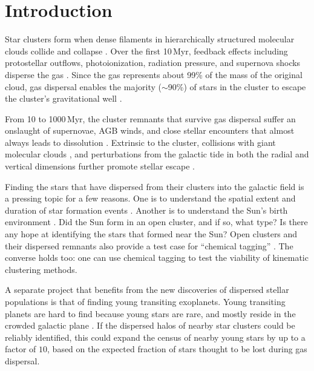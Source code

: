 \documentclass[12pt,twocolumn,tighten]{aastex63}
\begin{document}
\section{Introduction}

Star clusters form when dense filaments in hierarchically structured
molecular clouds collide and collapse \citep{shu_star_1987}.  Over the
first 10\,Myr, feedback effects including protostellar outflows,
photoionization, radiation pressure, and supernova shocks disperse the
gas \citep{krumholz_star_2019}.  Since the gas represents about 99\%
of the mass of the original cloud, gas dispersal enables the majority
($\sim$90\%) of stars in the cluster to escape the cluster's
gravitational well \citep{lada_embedded_2003}.

From 10 to 1000\,Myr, the cluster remnants that survive gas dispersal
suffer an onslaught of supernovae, AGB winds, and close stellar
encounters that almost always leads to dissolution
\citep{lamers_mass_loss_2010}.  Extrinsic to the cluster, collisions
with giant molecular clouds \citep{spitzer_disruption_1958}, and
perturbations from the galactic tide in both the radial and vertical
dimensions further promote stellar escape \citep[{\it
e.g.},][]{fukushige_timescale_2000,bergond_gravitational_2001}.

Finding the stars that have dispersed from their clusters into the
galactic field is a pressing topic for a few reasons.  One is to
understand the spatial extent and duration of star formation events
\citep[{\it e.g.},][]{wright_kinematics_2018}.  Another is to
understand the Sun's birth environment \citep{adams_birth_2010}.  Did
the Sun form in an open cluster, and if so, what type? Is there any
hope at identifying the stars that formed near the Sun?  Open clusters
and their dispersed remnants also provide a test case for ``chemical
tagging'' \citep[{\it
e.g.},][]{freeman_new_2002,hogg_chemical_2016,ness_dopplergangers_2018}.
The converse holds too: one can use chemical tagging to test the
viability of kinematic clustering methods.

A separate project that benefits from the new discoveries of dispersed
stellar populations is that of finding young transiting exoplanets.
Young transiting planets are hard to find because young stars are
rare, and mostly reside in the crowded galactic plane \citep[see {\it
e.g.},][]{Kharchenko_et_al_2013,piskunov_global_2018}.  If the
dispersed halos of nearby star clusters could be reliably identified,
this could expand the census of nearby young stars by up to a factor
of $10$, based on the expected fraction of stars thought to be lost
during gas dispersal.
\end{document}
